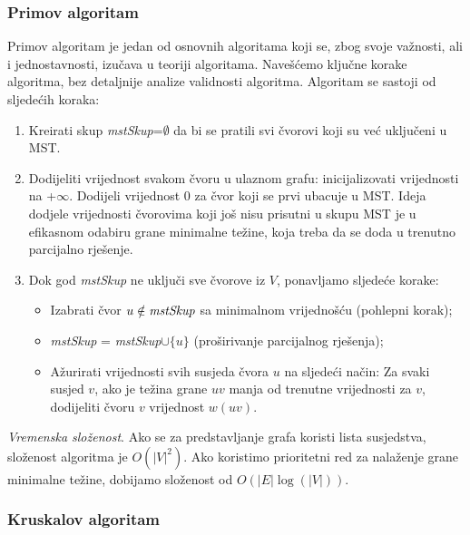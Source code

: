 \documentclass[b5paper, utf8, 11pt, colorlinks]{book}
\theoremstyle{definition}
\begin{document}
\subsubsection{Primov algoritam} 

Primov algoritam je jedan od osnovnih algoritama koji se, zbog svoje važnosti, ali i jednostavnosti, izučava u teoriji algoritama.  Navešćemo ključne korake algoritma, bez detaljnije analize validnosti algoritma. Algoritam se sastoji od sljedećih koraka:

\begin{enumerate} 
	\item Kreirati skup \emph{mstSkup}=$\emptyset$ da bi se pratili svi čvorovi koji su već uključeni u MST. 
	 \item Dodijeliti vrijednost svakom čvoru u ulaznom grafu: inicijalizovati vrijednosti na +$\infty$.   Dodijeli vrijednost  0 za čvor koji se prvi ubacuje u MST. 
	Ideja dodjele vrijednosti čvorovima koji još nisu prisutni u skupu MST je u efikasnom odabiru grane minimalne težine, koja treba da se doda u trenutno parcijalno rješenje. %
	\item Dok god \emph{mstSkup} ne uključi sve čvorove iz $V$, ponavljamo sljedeće korake: 
	\begin{itemize} 
		\item Izabrati čvor $u\notin\emph{mstSkup} $ sa minimalnom vrijednošću (pohlepni korak); 
		 \item \emph{mstSkup} = \emph{mstSkup}$\cup \{u\}$ (proširivanje parcijalnog rješenja);
		 \item Ažurirati vrijednosti svih susjeda čvora $u$ na sljedeći način:
		      Za svaki susjed $v$, ako je težina grane $uv$ manja od
		              trenutne vrijednosti za $v$, dodijeliti  čvoru $v$ vrijednost $w(uv)$. 		    
	        
	 \end{itemize}
 \end{enumerate}


 \emph{Vremenska složenost}. Ako se za predstavljanje grafa koristi lista susjedstva, složenost algoritma je $O(|V|^2)$. Ako  koristimo prioritetni red za nalaženje grane minimalne težine, dobijamo složenost od $O( |E| \log(|V|))$. 



\subsubsection{Kruskalov algoritam}
 
\end{document}
